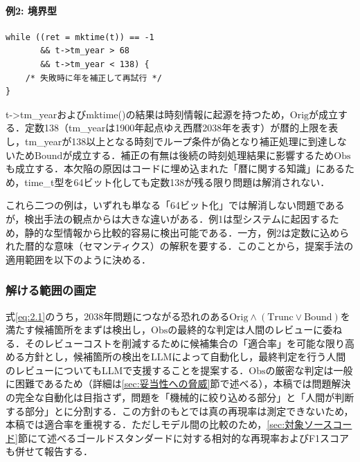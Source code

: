 \documentclass[submit,techrep,noauthor]{ipsj-lualatex}
\begin{document}
\paragraph*{例2: 境界型}

\begin{tcolorbox}[
	enhanced,
	breakable,
	colframe=black,
	colback=black!4,
	coltext=black,
	left=2mm,
	right=2mm,
	top=2mm,
	bottom=2mm,
	enlarge top by=4pt,
	enlarge bottom by=4pt,
	before skip=4pt,
	after skip=4pt,
]
\begin{verbatim}
while ((ret = mktime(t)) == -1
       && t->tm_year > 68
       && t->tm_year < 138) {
    /* 失敗時に年を補正して再試行 */
}
\end{verbatim}
\end{tcolorbox}

t-\textgreater tm\_yearおよびmktime()の結果は時刻情報に起源を持つため，$\mathrm{Orig}$が成立する．定数138（tm\_yearは1900年起点ゆえ西暦2038年を表す）が暦的上限を表し，tm\_yearが138以上となる時刻でループ条件が偽となり補正処理に到達しないため$\mathrm{Bound}$が成立する．補正の有無は後続の時刻処理結果に影響するため$\mathrm{Obs}$も成立する．本欠陥の原因はコードに埋め込まれた「暦に関する知識」にあるため，time\_t型を64ビット化しても定数138が残る限り問題は解消されない．

これら二つの例は，いずれも単なる「64ビット化」では解消しない問題であるが，検出手法の観点からは大きな違いがある．例1は型システムに起因するため，静的な型情報から比較的容易に検出可能である．一方，例2は定数に込められた暦的な意味（セマンティクス）の解釈を要する．このことから，提案手法の適用範囲を以下のように決める．

\subsubsection{解ける範囲の画定}
\label{sec:解ける範囲の画定}

式\ref{eq:2.1}のうち，2038年問題につながる恐れのある$\mathrm{Orig} \land (\mathrm{Trunc} \lor \mathrm{Bound})$を満たす候補箇所をまずは検出し，$\mathrm{Obs}$の最終的な判定は人間のレビューに委ねる．そのレビューコストを削減するために候補集合の「適合率」を可能な限り高める方針とし，候補箇所の検出をLLMによって自動化し，最終判定を行う人間のレビューについてもLLMで支援することを提案する．$\mathrm{Obs}$の厳密な判定は一般に困難であるため（詳細は\ref{sec:妥当性への脅威}節で述べる），本稿では問題解決の完全な自動化は目指さず，問題を「機械的に絞り込める部分」と「人間が判断する部分」とに分割する．この方針のもとでは真の再現率は測定できないため，本稿では適合率を重視する．ただしモデル間の比較のため，\ref{sec:対象ソースコード}節にて述べるゴールドスタンダードに対する相対的な再現率およびF1スコアも併せて報告する．
\end{document}
